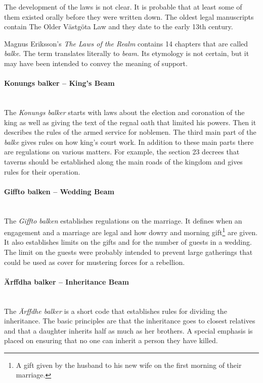 \documentclass[a4paper]{article}
\begin{document}
The development of the laws is not clear. It is probable that at least
some of them existed orally before they were written down. The oldest
legal manuscripts contain The Older Västgöta Law and they date to the
early 13th century.

Magnus Eriksson's \emph{The Laws of the Realm} contains 14 chapters
that are called \emph{balke}. The term translates literally to
\emph{beam}. Its etymology is not certain, but it may have been
intended to convey the meaning of support. 


\paragraph {Konungs balker – King's Beam} \mbox{}\\

The \emph{Konungs balker} starts with laws about the election and
coronation of the king as well as giving the text of the regnal oath
that limited his powers. Then it describes the rules of the armed
service for noblemen. The third main part of the \emph{balke} gives
rules on how king's court work. In addition to these main parts there
are regulations on various matters. For example, the section 23
decrees that taverns should be established along the main roads of the
kingdom and gives rules for their operation.


\paragraph {Giffto balken – Wedding Beam} \mbox{}\\

The \emph{Giffto balken} establishes regulations on the marriage. It
defines when an engagement and a marriage are legal and how dowry and
morning gift\footnote{A gift given by the husband to his new wife on
  the first morning of their marriage.} are given. It also establishes
limits on the gifts and for the number of guests in a wedding. The
limit on the guests were probably intended to prevent large gatherings
that could be used as cover for mustering forces for a rebellion.

\paragraph {Ärffdha balker – Inheritance Beam} \mbox{}\\

The \emph{Ärffdhe balker} is a short code that establishes rules for
dividing the inheritance. The basic principles are that the
inheritance goes to closest relatives and that a daughter inherits
half as much as her brothers. A special emphasis is placed on ensuring
that no one can inherit a person they have killed.
\end{document}
